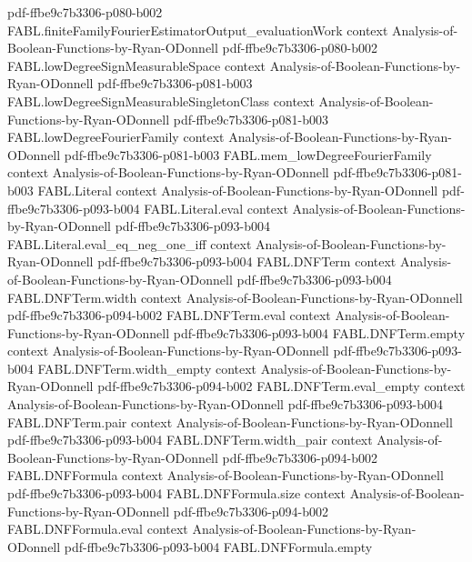 \begin{theorem}
  {pdf-ffbe9c7b3306-p080-b002}
\proofstep
  {FABL.finiteFamilyFourierEstimatorOutput_evaluationWork}
  {context}
  {Analysis-of-Boolean-Functions-by-Ryan-ODonnell}
  {pdf-ffbe9c7b3306-p080-b002}
\proofstep
  {FABL.lowDegreeSignMeasurableSpace}
  {context}
  {Analysis-of-Boolean-Functions-by-Ryan-ODonnell}
  {pdf-ffbe9c7b3306-p081-b003}
\proofstep
  {FABL.lowDegreeSignMeasurableSingletonClass}
  {context}
  {Analysis-of-Boolean-Functions-by-Ryan-ODonnell}
  {pdf-ffbe9c7b3306-p081-b003}
\proofstep
  {FABL.lowDegreeFourierFamily}
  {context}
  {Analysis-of-Boolean-Functions-by-Ryan-ODonnell}
  {pdf-ffbe9c7b3306-p081-b003}
\proofstep
  {FABL.mem_lowDegreeFourierFamily}
  {context}
  {Analysis-of-Boolean-Functions-by-Ryan-ODonnell}
  {pdf-ffbe9c7b3306-p081-b003}
\proofstep
  {FABL.Literal}
  {context}
  {Analysis-of-Boolean-Functions-by-Ryan-ODonnell}
  {pdf-ffbe9c7b3306-p093-b004}
\proofstep
  {FABL.Literal.eval}
  {context}
  {Analysis-of-Boolean-Functions-by-Ryan-ODonnell}
  {pdf-ffbe9c7b3306-p093-b004}
\proofstep
  {FABL.Literal.eval_eq_neg_one_iff}
  {context}
  {Analysis-of-Boolean-Functions-by-Ryan-ODonnell}
  {pdf-ffbe9c7b3306-p093-b004}
\proofstep
  {FABL.DNFTerm}
  {context}
  {Analysis-of-Boolean-Functions-by-Ryan-ODonnell}
  {pdf-ffbe9c7b3306-p093-b004}
\proofstep
  {FABL.DNFTerm.width}
  {context}
  {Analysis-of-Boolean-Functions-by-Ryan-ODonnell}
  {pdf-ffbe9c7b3306-p094-b002}
\proofstep
  {FABL.DNFTerm.eval}
  {context}
  {Analysis-of-Boolean-Functions-by-Ryan-ODonnell}
  {pdf-ffbe9c7b3306-p093-b004}
\proofstep
  {FABL.DNFTerm.empty}
  {context}
  {Analysis-of-Boolean-Functions-by-Ryan-ODonnell}
  {pdf-ffbe9c7b3306-p093-b004}
\proofstep
  {FABL.DNFTerm.width_empty}
  {context}
  {Analysis-of-Boolean-Functions-by-Ryan-ODonnell}
  {pdf-ffbe9c7b3306-p094-b002}
\proofstep
  {FABL.DNFTerm.eval_empty}
  {context}
  {Analysis-of-Boolean-Functions-by-Ryan-ODonnell}
  {pdf-ffbe9c7b3306-p093-b004}
\proofstep
  {FABL.DNFTerm.pair}
  {context}
  {Analysis-of-Boolean-Functions-by-Ryan-ODonnell}
  {pdf-ffbe9c7b3306-p093-b004}
\proofstep
  {FABL.DNFTerm.width_pair}
  {context}
  {Analysis-of-Boolean-Functions-by-Ryan-ODonnell}
  {pdf-ffbe9c7b3306-p094-b002}
\proofstep
  {FABL.DNFFormula}
  {context}
  {Analysis-of-Boolean-Functions-by-Ryan-ODonnell}
  {pdf-ffbe9c7b3306-p093-b004}
\proofstep
  {FABL.DNFFormula.size}
  {context}
  {Analysis-of-Boolean-Functions-by-Ryan-ODonnell}
  {pdf-ffbe9c7b3306-p094-b002}
\proofstep
  {FABL.DNFFormula.eval}
  {context}
  {Analysis-of-Boolean-Functions-by-Ryan-ODonnell}
  {pdf-ffbe9c7b3306-p093-b004}
\proofstep
  {FABL.DNFFormula.empty}

\end{theorem}
